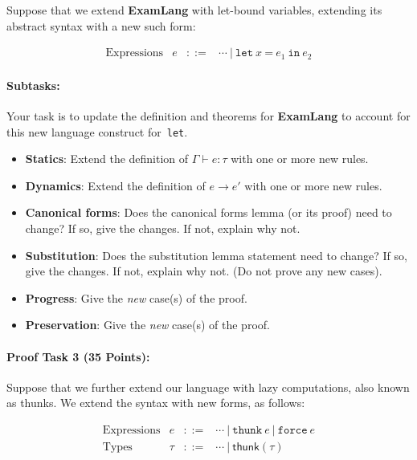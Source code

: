 \documentclass{article}
\newcommand{\stepsto}{\longrightarrow}
\begin{document}
Suppose that we extend \textbf{ExamLang} with let-bound variables,
extending its abstract syntax with a new such form:

\[\begin{array}{ccll}
\textrm{Expressions}  & e & ::= & \cdots ~|~ \texttt{let}~x~\texttt{=}~e_1~\texttt{in}~e_2
\end{array}
\]

\paragraph{Subtasks:}
Your task is to update the definition and theorems for
\textbf{ExamLang} to account for this new language construct for~\texttt{let}.

\begin{itemize}
\item \textbf{Statics}: Extend the definition of $\Gamma \vdash e : \tau$ with one or more new rules.

\item \textbf{Dynamics}: Extend the definition of $e \stepsto e'$ with one or more new rules.

\item \textbf{Canonical forms}: Does the canonical forms lemma (or its proof) need to
  change? If so, give the changes. If not, explain why not.

\item \textbf{Substitution}: Does the substitution lemma statement
  need to change? If so, give the changes. If not, explain why not.
  (Do not prove any new cases).

\item \textbf{Progress}: Give the \emph{new} case(s) of the proof.

\item \textbf{Preservation}: Give the \emph{new} case(s) of the proof.
\end{itemize}


\paragraph{Proof Task 3 (35 Points):}

Suppose that we further extend our language with lazy computations,
also known as thunks.
%
We extend the syntax with new forms, as follows:

\[\begin{array}{ccll}
\textrm{Expressions}  & e & ::= & \cdots ~|~ \texttt{thunk}~e ~|~ \texttt{force}~e
\\
\textrm{Types}     & \tau & ::= & \cdots ~|~ \textsf{thunk}(\tau)
\end{array}
\]
\end{document}
